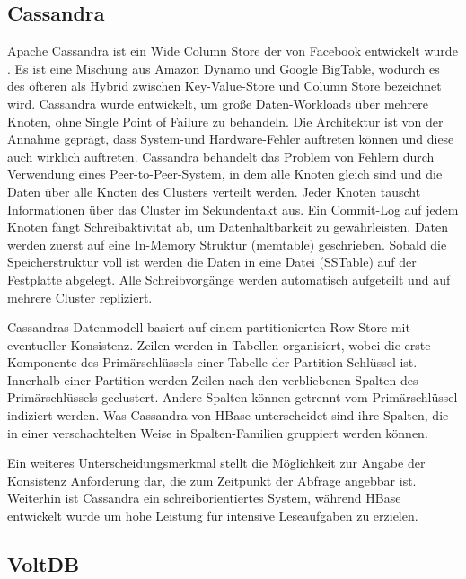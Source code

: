 \subsection{Cassandra} 
\label{ch:AnalyseDatenbanken:sec:Datenbanken:subsec:Cassandra}
Apache Cassandra ist ein Wide Column Store der von Facebook entwickelt wurde \cite{Lakshman:2010:CDS:1773912.1773922}. Es ist eine Mischung aus Amazon Dynamo und Google BigTable, wodurch es des öfteren als Hybrid zwischen Key-Value-Store und Column Store bezeichnet wird. Cassandra wurde entwickelt, um große Daten-Workloads über mehrere Knoten, ohne Single Point of Failure zu behandeln. Die Architektur ist von der Annahme geprägt, dass System-und Hardware-Fehler auftreten können und diese auch wirklich auftreten. Cassandra behandelt das Problem von Fehlern durch Verwendung eines Peer-to-Peer-System, in dem alle Knoten gleich sind und die Daten über alle Knoten des Clusters verteilt werden. Jeder Knoten tauscht Informationen über das Cluster im Sekundentakt aus. Ein Commit-Log auf jedem Knoten fängt Schreibaktivität ab, um Datenhaltbarkeit zu gewährleisten. Daten werden zuerst auf eine In-Memory Struktur (memtable) geschrieben. Sobald die Speicherstruktur voll ist werden die Daten in eine Datei (SSTable) auf der Festplatte abgelegt. Alle Schreibvorgänge werden automatisch aufgeteilt und auf mehrere Cluster repliziert. 

Cassandras Datenmodell basiert auf einem partitionierten Row-Store mit eventueller Konsistenz. Zeilen werden in Tabellen organisiert, wobei die erste Komponente des Primärschlüssels einer Tabelle der Partition-Schlüssel ist. Innerhalb einer Partition werden Zeilen nach den verbliebenen Spalten des Primärschlüssels geclustert. Andere Spalten können getrennt vom Primärschlüssel indiziert werden. Was Cassandra von HBase unterscheidet sind ihre Spalten, die in einer verschachtelten Weise in Spalten-Familien gruppiert werden können.

Ein weiteres Unterscheidungsmerkmal stellt die Möglichkeit zur Angabe der Konsistenz Anforderung dar, die zum Zeitpunkt der Abfrage angebbar ist. Weiterhin ist Cassandra ein schreiborientiertes System, während HBase entwickelt wurde um hohe Leistung für intensive Leseaufgaben zu erzielen.

\subsection{VoltDB} 
\label{ch:AnalyseDatenbanken:sec:Datenbanken:subsec:VoltDB}

